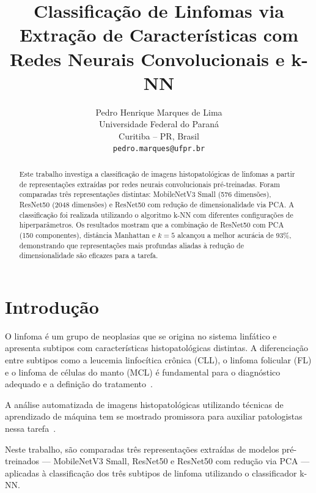 \documentclass[10pt,twocolumn,letterpaper]{article}
\begin{document}
\title{Classificação de Linfomas via Extração de Características com Redes Neurais Convolucionais e k-NN}

\author{Pedro Henrique Marques de Lima\\
Universidade Federal do Paraná\\
Curitiba -- PR, Brasil\\
{\tt\small pedro.marques@ufpr.br}
}
\maketitle

\begin{abstract}
Este trabalho investiga a classificação de imagens histopatológicas de linfomas a partir de representações extraídas por redes neurais convolucionais pré-treinadas. Foram comparadas três representações distintas: MobileNetV3 Small (576 dimensões), ResNet50 (2048 dimensões) e ResNet50 com redução de dimensionalidade via PCA. A classificação foi realizada utilizando o algoritmo k-NN com diferentes configurações de hiperparâmetros. Os resultados mostram que a combinação de ResNet50 com PCA (150 componentes), distância Manhattan e $k=5$ alcançou a melhor acurácia de 93\%, demonstrando que representações mais profundas aliadas à redução de dimensionalidade são eficazes para a tarefa.
\end{abstract}

\section{Introdução}
\label{sec:intro}

O linfoma é um grupo de neoplasias que se origina no sistema linfático e apresenta subtipos com características histopatológicas distintas. A diferenciação entre subtipos como a leucemia linfocítica crônica (CLL), o linfoma folicular (FL) e o linfoma de células do manto (MCL) é fundamental para o diagnóstico adequado e a definição do tratamento~\cite{Orlov2010}.

A análise automatizada de imagens histopatológicas utilizando técnicas de aprendizado de máquina tem se mostrado promissora para auxiliar patologistas nessa tarefa~\cite{Shamir2008}.

Neste trabalho, são comparadas três representações extraídas de modelos pré-treinados --- MobileNetV3 Small, ResNet50 e ResNet50 com redução via PCA --- aplicadas à classificação dos três subtipos de linfoma utilizando o classificador k-NN.
\end{document}
